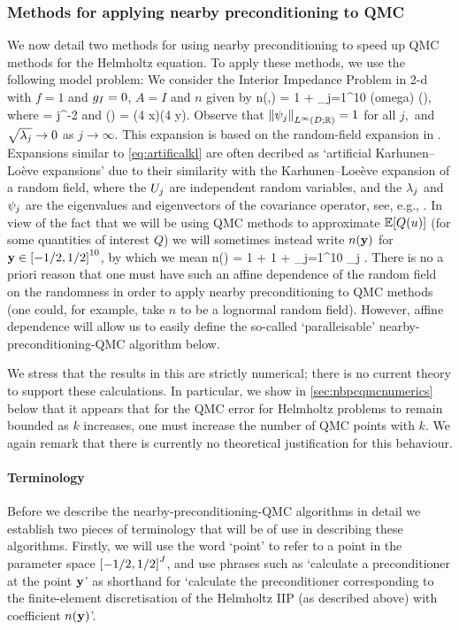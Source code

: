 \subsubsection{Methods for applying nearby preconditioning to QMC}\label{sec:nbpcqmcnum}
We now detail two methods for using nearby preconditioning to speed up QMC methods for the Helmholtz equation. To apply these methods, we use the following model problem: We consider the Interior Impedance Problem in 2-d with $f=1$ and $g_{I}=0$, $A = I$ and $n$ given by
\beq\label{eq:artificialkl}
n(\omega,\bx) = 1 + \sum_{j=1}^{10} \Uj(omega) \sqrt{\lambdaj} \psij(\bx),
\eeq
where
\beqs
\sqrt{\lambdaj} = j^{-2}
\eeqs
and
\beqs
\psij(\bx) = \cos\mleft(4 x\mright)\cos\mleft(4 y\mright).
\eeqs
Observe that $\NLiDRR{\psij}=1$ for all $j,$ and $\sqrt{\lambda_{j}} \rightarrow 0$ as $j \rightarrow \infty.$ This expansion is based on the random-field expansion in \cite[Section 5.1]{GiGrKuScSl:19}. Expansions similar to \cref{eq:artificalkl} are often decribed as `artificial Karhunen--Lo\`eve expansions' due to their similarity with the Karhunen--Loe\`eve expansion of a random field, where the $U_{j}$ are independent random variables, and the $\lambda_{j}$ and $\psi_{j}$ are the eigenvalues and eigenvectors of the covariance operator, see, e.g., \cite[Section 7.4]{LoPoSh:14}. In view of the fact that we will be using QMC methods to approximate $\EXP{Q(u)}$ (for some quantities of interest $Q$) we will sometimes instead write $n(\mathbf{y})$ for $\by \in \cube{10}$, by which we mean
\beqs
n(\by) = 1 + 1 + \sum_{j=1}^{10} \by_{j} \sqrt{\lambdaj} \psij.
\eeqs
There is no a priori reason that one must have such an affine dependence of the random field on the randomness in order to apply nearby preconditioning to QMC methods (one could, for example, take $n$ to be a lognormal random field). However, affine dependence will allow us to easily define the so-called `paralleisable' nearby-preconditioning-QMC algorithm below.

We stress that the results in this  are strictly numerical; there is no current theory to support these calculations. In particular, we show in \cref{sec:nbpcqmcnumerics} below that it appears that for the QMC error for Helmholtz problems to remain bounded as $k$ increases, one must increase the number of QMC points with $k.$ We again remark that there is currently no theoretical justification for this behaviour.


\paragraph{Terminology} Before we describe the nearby-preconditioning-QMC algorithms in detail we establish two pieces of terminology that will be of use in describing these algorithms. Firstly, we will use the word `point' to refer to a point in the parameter space $\cube{J}$, and use phrases such as `calculate a preconditioner at the point $\mathbf{y}$' as shorthand for `calculate the preconditioner corresponding to the finite-element discretisation of the Helmholtz IIP (as described above) with coefficient $n(\mathbf{y})$'.

